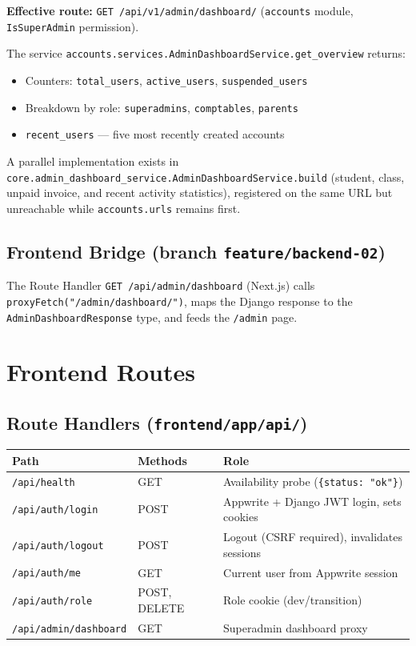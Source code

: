 \documentclass[11pt,a4paper]{article}
\begin{document}
\textbf{Effective route:} \texttt{GET /api/v1/admin/dashboard/} (\texttt{accounts} module, \texttt{IsSuperAdmin} permission).

The service \texttt{accounts.services.AdminDashboardService.get\_overview} returns:
\begin{itemize}[noitemsep]
    \item Counters: \texttt{total\_users}, \texttt{active\_users}, \texttt{suspended\_users}
    \item Breakdown by role: \texttt{superadmins}, \texttt{comptables}, \texttt{parents}
    \item \texttt{recent\_users} --- five most recently created accounts
\end{itemize}

A parallel implementation exists in \texttt{core.admin\_dashboard\_service.AdminDashboardService.build} (student, class, unpaid invoice, and recent activity statistics), registered on the same URL but unreachable while \texttt{accounts.urls} remains first.

\subsection{Frontend Bridge (branch \texttt{feature/backend-02})}

The Route Handler \texttt{GET /api/admin/dashboard} (Next.js) calls \texttt{proxyFetch("/admin/dashboard/")}, maps the Django response to the \texttt{AdminDashboardResponse} type, and feeds the \texttt{/admin} page.

\section{Frontend Routes}

\subsection{Route Handlers (\texttt{frontend/app/api/})}

\begin{longtable}{@{}llp{6.5cm}@{}}
\toprule
\textbf{Path} & \textbf{Methods} & \textbf{Role} \\
\midrule
\endhead
\texttt{/api/health} & GET & Availability probe (\texttt{\{status: "ok"\}}) \\
\texttt{/api/auth/login} & POST & Appwrite + Django JWT login, sets cookies \\
\texttt{/api/auth/logout} & POST & Logout (CSRF required), invalidates sessions \\
\texttt{/api/auth/me} & GET & Current user from Appwrite session \\
\texttt{/api/auth/role} & POST, DELETE & Role cookie (dev/transition) \\
\texttt{/api/admin/dashboard} & GET & Superadmin dashboard proxy \\
\bottomrule
\end{longtable}
\end{document}
